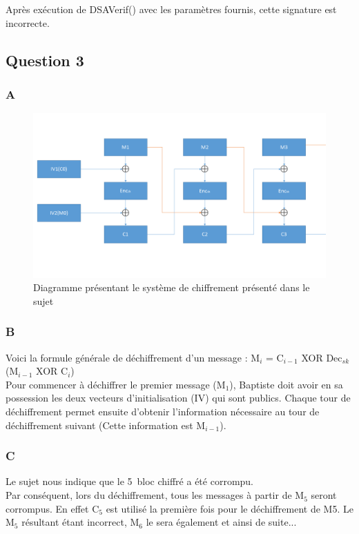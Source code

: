 \documentclass[a4paper, 11pt, oneside]{article}
\begin{document}
Après exécution de DSAVerif() avec les paramètres fournis, cette signature est incorrecte.

\newpage
\subsection{Question 3}

\subsubsection{A}

\begin{figure}[h!]
  \centering
  \includegraphics[width=\textwidth]{CBC.png}
  \caption{Diagramme présentant le système de chiffrement présenté dans le sujet}
\end{figure}

\subsubsection{B}

Voici la formule générale de déchiffrement d'un message : M$_{i}$ = C$_{i-1}$ XOR Dec$_{sk}$(M$_{i-1}$ XOR C$_{i}$)\\[5pt]
Pour commencer à déchiffrer le premier message (M$_{1}$), Baptiste doit avoir en sa possession les deux vecteurs d'initialisation (IV) qui sont publics. Chaque \og tour de déchiffrement \fg  permet ensuite d'obtenir l'information nécessaire au \og tour de déchiffrement \fg  suivant (Cette information est M$_{i-1}$).

\subsubsection{C}

Le sujet nous indique que le 5\ieme \ bloc chiffré a été corrompu.\\
Par conséquent, lors du déchiffrement, tous les messages à partir de M$_{5}$ seront corrompus. En effet C$_{5}$ est utilisé la première fois pour le déchiffrement de M5. Le M$_{5}$ résultant étant incorrect, M$_{6}$ le sera également et ainsi de suite...
\end{document}
